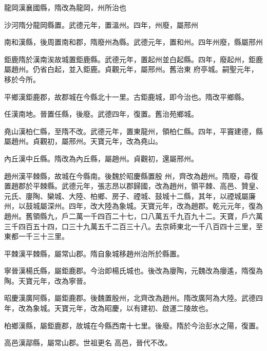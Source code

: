 \begin{pinyinscope}
 龍岡漢襄國縣，隋改為龍岡，州所治也



 沙河隋分龍岡縣置。武德元年，置溫州。四年，州廢，屬邢州



 南和漢縣，後周置南和郡，隋廢州為縣。武德元年，置和州。四年州廢，縣屬邢州



 鉅鹿隋於漢南涘故城置鉅鹿縣。武德元年，置起州並白起縣。四年，廢起州，鉅鹿屬趙州。仍省白起，並入鉅鹿。貞觀元年，屬邢州。舊治東
 府亭城。嗣聖元年，移於今所。



 平鄉漢鉅鹿郡，故郡城在今縣北十一里。古鉅鹿城，即今治也。隋改平鄉縣。



 任漢南地。晉置任縣，後廢。武德四年，復置。舊治苑鄉城。



 堯山漢柏仁縣，至隋不改。武德元年，置東龍州，領柏仁縣。四年，平竇建德，縣屬趙州。貞觀初，屬邢州。天寶元年，改為堯山。



 內丘漢中丘縣。隋改為內丘縣，屬趙州。貞觀初，還屬邢州。



 趙州漢平棘縣，故城在今縣南。後魏於昭慶縣置殷
 州，齊改為趙州。隋廢，尋復置趙郡於平棘縣。武德元年，張志昂以郡歸國，改為趙州，領平棘、高邑、贊皇、元氏、廮陶、欒城、大陸、柏鄉、房子、禋城、鼓城十二縣，其年，以禋城屬廉州，以鼓城屬深州。四年，改大陸為象城。天寶元年，改為趙郡。乾元元年，復為趙州。舊領縣九，戶二萬一千四百二十七，口八萬五千九百九十二。天寶，戶六萬三千四百五十四，口三十九萬五千二百三十八。去京師東北一千八百四十三里，至東都一千三十三里。



 平棘漢平棘縣，屬常山郡。隋自象城移趙州治所於縣置。



 寧晉漢楊氏縣，屬鉅鹿郡。今治即楊氏城也。後改為廮陶，元魏改為癭遙，隋復為陶。天寶元年，改為寧晉。



 昭慶漢廣阿縣，屬鉅鹿郡。後魏置殷州，北齊改為趙州。隋改廣阿為大陸。武德四年，改為象城。天寶元年，改為昭慶，以有建初、啟運二陵故也。



 柏鄉漢縣，屬鉅鹿郡，故城在今縣西南十七里。後廢。隋於今治彭水之陽，復置。



 高邑漢鄗縣，屬常山郡。世祖更名
 高邑，晉代不改。




\end{pinyinscope}
